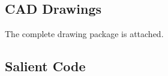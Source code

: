 \subsection{CAD Drawings}
The complete drawing package is attached.

\subsection{Salient Code}

\vspace{10ex}


\vspace{10ex}


\vspace{10ex}

% 


